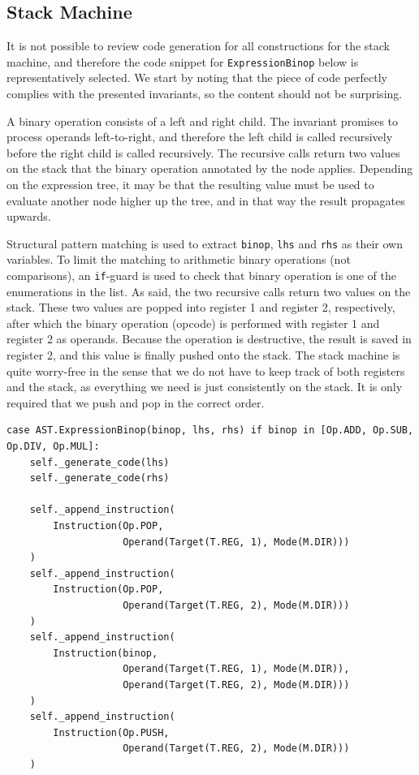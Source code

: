 \subsection{Stack Machine}
It is not possible to review code generation for all constructions for the stack machine, and therefore the code snippet for \texttt{ExpressionBinop} below is representatively selected. We start by noting that the piece of code perfectly complies with the presented invariants, so the content should not be surprising.

A binary operation consists of a left and right child. The invariant promises to process operands left-to-right, and therefore the left child is called recursively before the right child is called recursively. The recursive calls return two values on the stack that the binary operation annotated by the node applies. Depending on the expression tree, it may be that the resulting value must be used to evaluate another node higher up the tree, and in that way the result propagates upwards.

Structural pattern matching is used to extract \texttt{binop}, \texttt{lhs} and \texttt{rhs} as their own variables. To limit the matching to arithmetic binary operations (not comparisons), an \texttt{if}-guard is used to check that binary operation is one of the enumerations in the list. As said, the two recursive calls return two values on the stack. These two values are popped into register 1 and register 2, respectively, after which the binary operation (opcode) is performed with register 1 and register 2 as operands. Because the operation is destructive, the result is saved in register 2, and this value is finally pushed onto the stack. The stack machine is quite worry-free in the sense that we do not have to keep track of both registers and the stack, as everything we need is just consistently on the stack. It is only required that we push and pop in the correct order.

\begin{verbatim}
case AST.ExpressionBinop(binop, lhs, rhs) if binop in [Op.ADD, Op.SUB, Op.DIV, Op.MUL]:
    self._generate_code(lhs)
    self._generate_code(rhs)

    self._append_instruction(
        Instruction(Op.POP,
                    Operand(Target(T.REG, 1), Mode(M.DIR)))
    )
    self._append_instruction(
        Instruction(Op.POP,
                    Operand(Target(T.REG, 2), Mode(M.DIR)))
    )
    self._append_instruction(
        Instruction(binop,
                    Operand(Target(T.REG, 1), Mode(M.DIR)),
                    Operand(Target(T.REG, 2), Mode(M.DIR)))
    )
    self._append_instruction(
        Instruction(Op.PUSH,
                    Operand(Target(T.REG, 2), Mode(M.DIR)))
    )
\end{verbatim}

